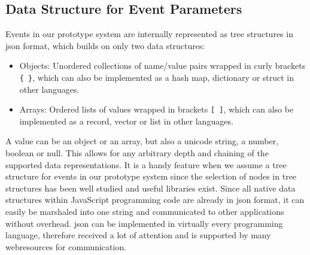 \subsection{Data Structure for Event Parameters}
Events in our prototype system are internally represented as tree structures in \textrm{\acrshort{json}} format, which builds on only two data structures:
\begin{itemize}
	\item Objects: Unordered collections of name/value pairs wrapped in curly brackets \texttt{\{ \}}, which can also be implemented as a hash map, dictionary or struct in other languages.
	\item Arrays: Ordered lists of values wrapped in brackets \texttt{[ ]}, which can also be implemented as a record, vector or list in other languages.
\end{itemize}
A value can be an object or an array, but also a unicode string, a number, boolean or null.
This allows for any arbitrary depth and chaining of the supported data representations.
It is a handy feature when we assume a tree structure for events in our prototype system since the selection of nodes in tree structures has been well studied and useful libraries exist.
Since all native data structures within \textrm{JavaScript} programming code are already in \textrm{\acrshort{json}} format, it can easily be marshaled into one string and communicated to other applications without overhead.
\textrm{\acrshort{json}} can be implemented in virtually every programming language, therefore received a lot of attention and is supported by many \textrm{\glspl{webresource}} for communication.



